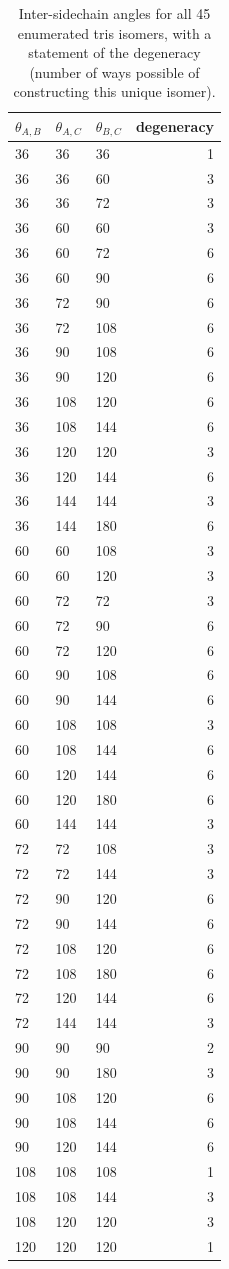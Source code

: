 \documentclass[journal=nanofd,manuscript=suppinfo]{achemso}
\begin{document}
\begin{table}[ht!]
    \begin{tabular}{lllr}
\toprule
$\theta_{A,B}$ & $\theta_{A,C}$ & $\theta_{B,C}$ & degeneracy \\
\midrule
36 & 36 & 36 & 1 \\
36 & 36 & 60 & 3 \\
36 & 36 & 72 & 3 \\
36 & 60 & 60 & 3 \\
36 & 60 & 72 & 6 \\
36 & 60 & 90 & 6 \\
36 & 72 & 90 & 6 \\
36 & 72 & 108 & 6 \\
36 & 90 & 108 & 6 \\
36 & 90 & 120 & 6 \\
36 & 108 & 120 & 6 \\
36 & 108 & 144 & 6 \\
36 & 120 & 120 & 3 \\
36 & 120 & 144 & 6 \\
36 & 144 & 144 & 3 \\
36 & 144 & 180 & 6 \\
60 & 60 & 108 & 3 \\
60 & 60 & 120 & 3 \\
60 & 72 & 72 & 3 \\
60 & 72 & 90 & 6 \\
60 & 72 & 120 & 6 \\
60 & 90 & 108 & 6 \\
60 & 90 & 144 & 6 \\
60 & 108 & 108 & 3 \\
60 & 108 & 144 & 6 \\
60 & 120 & 144 & 6 \\
60 & 120 & 180 & 6 \\
60 & 144 & 144 & 3 \\
72 & 72 & 108 & 3 \\
72 & 72 & 144 & 3 \\
72 & 90 & 120 & 6 \\
72 & 90 & 144 & 6 \\
72 & 108 & 120 & 6 \\
72 & 108 & 180 & 6 \\
72 & 120 & 144 & 6 \\
72 & 144 & 144 & 3 \\
90 & 90 & 90 & 2 \\
90 & 90 & 180 & 3 \\
90 & 108 & 120 & 6 \\
90 & 108 & 144 & 6 \\
90 & 120 & 144 & 6 \\
108 & 108 & 108 & 1 \\
108 & 108 & 144 & 3 \\
108 & 120 & 120 & 3 \\
120 & 120 & 120 & 1 
\end{tabular}
\caption{\label{table-tris}Inter-sidechain angles for all 45 enumerated tris isomers, with a statement of the degeneracy (number of ways possible of constructing this unique isomer).}
\end{table}
\end{document}
